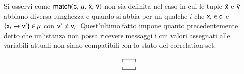 Si osservi come ${\sf match}({\sf c},\, {\sf \mu},\, \bar{{\sf x}},\, \bar{{\sf v}})$ non sia
definita nel caso in cui le tuple $\bar{{\sf x}}$ e $\bar{{\sf v}}$ abbiano diversa
lunghezza e quando si abbia per un qualche $i$ che ${\sf x}_i \in {\sf c}$ e
$\{{\sf x}_i \mapsto {\sf v}'\} \in {\sf \mu}$ con ${\sf v}' \neq {\sf v}_i$. 
Quest'ultimo fatto impone quanto precedentemente detto che un'istanza non possa
ricevere messaggi i cui valori assegnati alle variabili attuali non siano
compatibili con lo stato del correlation set.

\begin{table}[t!]
\begin{small}
$$
\delimite{
\begin{array}{c}
%

\end{array}}$$
\end{small}
\end{table}
